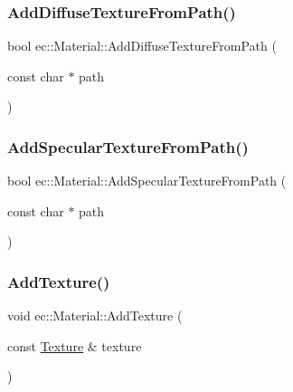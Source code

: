 \subsubsection{\texorpdfstring{Add\+Diffuse\+Texture\+From\+Path()}{AddDiffuseTextureFromPath()}}
{\footnotesize\ttfamily bool ec\+::\+Material\+::\+Add\+Diffuse\+Texture\+From\+Path (\begin{DoxyParamCaption}\item[{const char $\ast$}]{path }\end{DoxyParamCaption})}

\mbox{\label{classec_1_1_material_a323e90a5acd82fa056c952b429e93eb4}} 
\subsubsection{\texorpdfstring{Add\+Specular\+Texture\+From\+Path()}{AddSpecularTextureFromPath()}}
{\footnotesize\ttfamily bool ec\+::\+Material\+::\+Add\+Specular\+Texture\+From\+Path (\begin{DoxyParamCaption}\item[{const char $\ast$}]{path }\end{DoxyParamCaption})}

\mbox{\label{classec_1_1_material_a56e14ac3904504ef549bad2c26ad6ca1}} 
\subsubsection{\texorpdfstring{Add\+Texture()}{AddTexture()}}
{\footnotesize\ttfamily void ec\+::\+Material\+::\+Add\+Texture (\begin{DoxyParamCaption}\item[{const \mbox{\hyperlink{classec_1_1_texture}{Texture}} \&}]{texture }\end{DoxyParamCaption})}

\mbox{\label{classec_1_1_material_a1d2b8ebe3ea664d8fa17868f2ca2a397}} 
